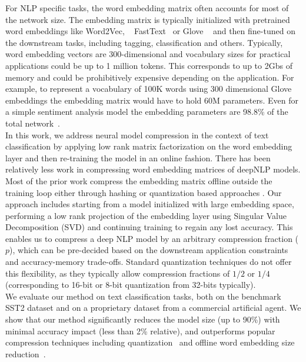 For NLP specific tasks, the word embedding matrix often
accounts for most of the network size. The embedding matrix is typically
initialized with pretrained word embeddings like Word2Vec, ~\cite{mikolov2013a}
FastText~\cite{bojanowski2016enriching} or Glove ~\cite{pennington2014glove} and then fine-tuned on the
downstream tasks, including tagging, classification and others. Typically, word
embedding vectors are 300-dimensional and vocabulary sizes for practical
applications could be up to 1 million tokens. This corresponds to up to 2Gbs of
memory and could be prohibitively expensive depending on the application. For
example, to represent a vocabulary of 100K words using 300 dimensional Glove
embeddings the embedding matrix would have to hold 60M parameters. Even for a
simple sentiment analysis model the embedding parameters are 98.8\% of the total
network~\cite{shu2017compressing}.  \\
In this work, we address neural model compression in the context of text
classification by applying low rank matrix factorization on the word embedding layer and then re-training the model in an online fashion. There has been relatively less work in compressing word embedding matrices of deepNLP models. Most of the prior work compress the embedding matrix offline outside the training loop either through hashing or quantization based approaches \cite{joulin2016fasttext,shu2017compressing,raunak2017effective}.
Our approach includes starting from a model initialized with large embedding space, performing a low rank projection of the embedding layer using Singular Value Decomposition (SVD) and continuing training to regain any lost accuracy. This enables us to compress a deep NLP model by an arbitrary compression fraction ($p$), which can be
pre-decided based on the downstream application constraints and accuracy-memory
trade-offs. Standard quantization techniques do not offer this flexibility, as
they typically allow compression fractions of $1/2$ or $1/4$ (corresponding to
16-bit or 8-bit quantization from 32-bits typically). \\
We evaluate our method on text classification tasks, both on the benchmark SST2 dataset and on a proprietary dataset from a commercial artificial agent. We show that our method significantly reduces the model size (up to 90\%) with minimal accuracy impact (less than 2\% relative), and outperforms popular compression techniques including quantization~\cite{hubara2016quantized} and offline word embedding size reduction~\cite{raunak2017effective}.\\
